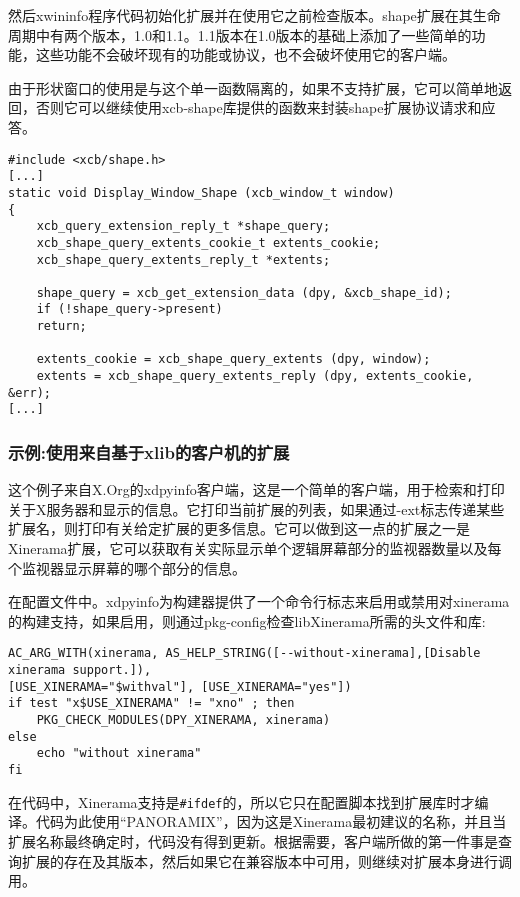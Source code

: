 然后xwininfo程序代码初始化扩展并在使用它之前检查版本。shape扩展在其生命周期中有两个版本，1.0和1.1。1.1版本在1.0版本的基础上添加了一些简单的功能，这些功能不会破坏现有的功能或协议，也不会破坏使用它的客户端。

由于形状窗口的使用是与这个单一函数隔离的，如果不支持扩展，它可以简单地返回，否则它可以继续使用xcb-shape库提供的函数来封装shape扩展协议请求和应答。

\begin{lstlisting}
#include <xcb/shape.h>
[...]
static void Display_Window_Shape (xcb_window_t window)
{
	xcb_query_extension_reply_t *shape_query;
	xcb_shape_query_extents_cookie_t extents_cookie;
	xcb_shape_query_extents_reply_t *extents;
	
	shape_query = xcb_get_extension_data (dpy, &xcb_shape_id);
	if (!shape_query->present)
	return;
	
	extents_cookie = xcb_shape_query_extents (dpy, window);
	extents = xcb_shape_query_extents_reply (dpy, extents_cookie, &err);
[...]
\end{lstlisting}
\vspace{-4em}

\subsubsection{示例:使用来自基于xlib的客户机的扩展}

这个例子来自X.Org的xdpyinfo客户端，这是一个简单的客户端，用于检索和打印关于X服务器和显示的信息。它打印当前扩展的列表，如果通过-ext标志传递某些扩展名，则打印有关给定扩展的更多信息。它可以做到这一点的扩展之一是Xinerama扩展，它可以获取有关实际显示单个逻辑屏幕部分的监视器数量以及每个监视器显示屏幕的哪个部分的信息。

在配置文件中。xdpyinfo为构建器提供了一个命令行标志来启用或禁用对xinerama的构建支持，如果启用，则通过pkg-config检查libXinerama所需的头文件和库:

\begin{lstlisting}
AC_ARG_WITH(xinerama, AS_HELP_STRING([--without-xinerama],[Disable xinerama support.]),
[USE_XINERAMA="$withval"], [USE_XINERAMA="yes"])
if test "x$USE_XINERAMA" != "xno" ; then
	PKG_CHECK_MODULES(DPY_XINERAMA, xinerama)
else
	echo "without xinerama"
fi
\end{lstlisting}
\vspace{-4em}

在代码中，Xinerama支持是\lstinline|#ifdef|的，所以它只在配置脚本找到扩展库时才编译。代码为此使用“PANORAMIX”，因为这是Xinerama最初建议的名称，并且当扩展名称最终确定时，代码没有得到更新。根据需要，客户端所做的第一件事是查询扩展的存在及其版本，然后如果它在兼容版本中可用，则继续对扩展本身进行调用。


